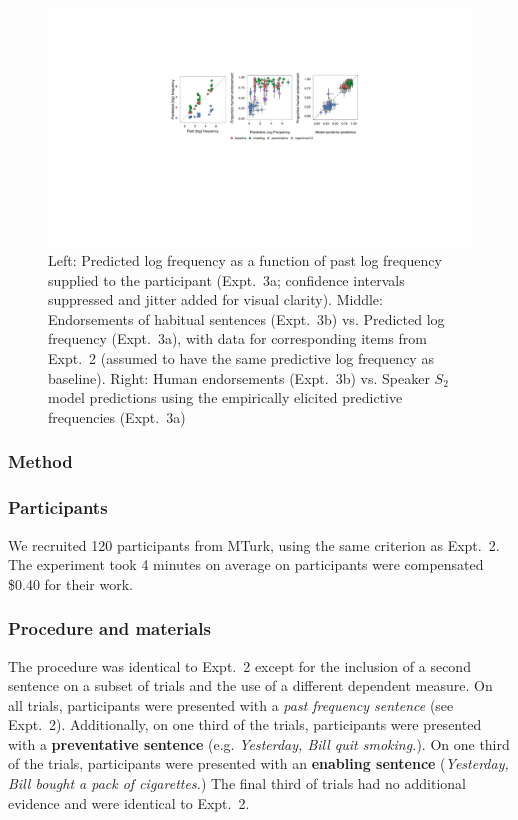 \documentclass[10pt,letterpaper]{article}
\begin{document}
\begin{figure}[t]
\centering
  \includegraphics[width=\textwidth]{expt3-4-scatters-2.pdf}
  \caption{Left: Predicted log frequency as a function of past log frequency supplied to the participant (Expt.~3a; confidence intervals suppressed and jitter added for visual clarity).
  Middle: Endorsements of habitual sentences (Expt.~3b) vs. Predicted log frequency (Expt.~3a), with data for corresponding items from Expt.~2 (assumed to have the same predictive log frequency as baseline). 
  Right: Human endorsements (Expt.~3b) vs. Speaker $S_2$ model predictions using the empirically elicited predictive frequencies (Expt.~3a)}
  \label{fig:tj3}
\end{figure}
\subsubsection{Method}
\subsubsection{Participants} 

We recruited 120 participants from MTurk, using the same criterion as Expt.~2.
The experiment took 4 minutes on average on participants were compensated \$0.40 for their work.

\subsubsection{Procedure and materials}

The procedure was identical to Expt.~2 except for the inclusion of a second sentence on a subset of trials and the use of a different dependent measure. 
On all trials, participants were presented with a \emph{past frequency sentence} (see Expt.~2).
Additionally, on one third of the trials, participants were presented with a \textbf{preventative sentence} (e.g. \emph{Yesterday, Bill quit smoking.}). %
On one third of the trials, participants were presented with an \textbf{enabling sentence} (\emph{Yesterday, Bill bought a pack of cigarettes.}) %
The final third of trials had no additional evidence and were identical to Expt.~2. 
\end{document}
